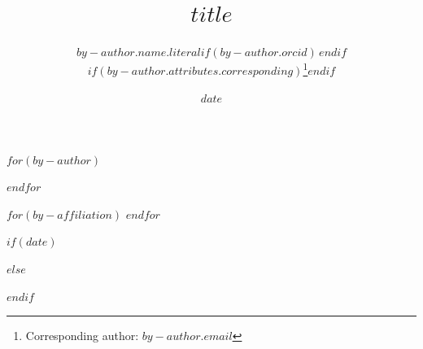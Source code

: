 \title{$title$}

$for(by-author)$
\author[$for(by-author.affiliations)$$it.number$$sep$,$endfor$]{$by-author.name.literal$$if(by-author.orcid)$\,$endif$$if(by-author.attributes.corresponding)$\thanks{Corresponding author: $by-author.email$}$endif$}
$endfor$

$for(by-affiliation)$
$endfor$

$if(date)$
\date{$date$}
$else$
\date{}
$endif$
